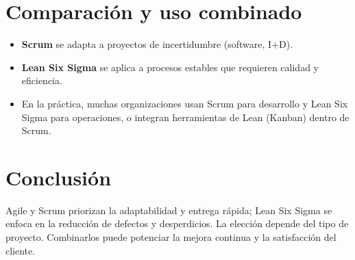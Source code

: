 \documentclass[12pt]{article}
\begin{document}
\section*{Comparación y uso combinado}
\begin{itemize}
    \item \textbf{Scrum} se adapta a proyectos de incertidumbre (software, I+D).
    \item \textbf{Lean Six Sigma} se aplica a procesos estables que requieren calidad y eficiencia.
    \item En la práctica, muchas organizaciones usan Scrum para desarrollo y Lean Six Sigma para operaciones, o integran herramientas de Lean (Kanban) dentro de Scrum.
\end{itemize}

\section*{Conclusión}
Agile y Scrum priorizan la adaptabilidad y entrega rápida; Lean Six Sigma se enfoca en la reducción de defectos y desperdicios. La elección depende del tipo de proyecto. Combinarlos puede potenciar la mejora continua y la satisfacción del cliente.
\end{document}
